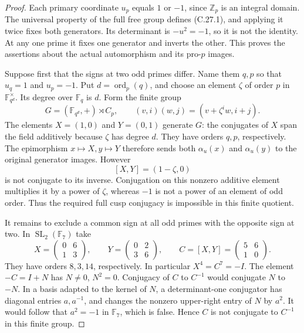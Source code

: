 \begin{proof}
Each primary coordinate $u_p$ equals $1$ or $-1$, since
$\mathbb Z_p$ is an integral domain.  The universal
property of the full free group defines (C.27.1), and
applying it twice fixes both generators.  Its determinant
is $-u^2=-1$, so it is not the identity.  At any one prime
it fixes one generator and inverts the other.  This
proves the assertions about the actual automorphism and
its pro-$p$ images.

Suppose first that the signs at two odd primes differ.
Name them $q,p$ so that $u_q=1$ and $u_p=-1$.  Put
$d=\operatorname{ord}_p(q)$, and choose an element
$\zeta$ of order $p$ in $\mathbb F_{q^d}^{\times}$.
Its degree over $\mathbb F_q$ is $d$.  Form the finite
group
\[
 G=(\mathbb F_{q^d},+)\rtimes C_p,
 \qquad (v,i)(w,j)=(v+\zeta^i w,i+j).
                                                               \tag{C.27.2}
\]
The elements $X=(1,0)$ and $Y=(0,1)$ generate $G$:
the conjugates of $X$ span the field additively because
$\zeta$ has degree $d$.  They have orders $q,p$,
respectively.  The epimorphism $x\mapsto X,y\mapsto Y$
therefore sends both $\alpha_u(x)$ and $\alpha_u(y)$
to the original generator images.  However
\[
 [X,Y]=(1-\zeta,0)
\]
is not conjugate to its inverse.  Conjugation on this
nonzero additive element multiplies it by a power of
$\zeta$, whereas $-1$ is not a power of an element of
odd order.  Thus the required full cusp conjugacy is
impossible in this finite quotient.

It remains to exclude a common sign at all odd primes
with the opposite sign at two.  In $\operatorname{SL}_2
(\mathbb F_7)$ take
\[
 X=\begin{pmatrix}0&6\\1&3\end{pmatrix},\qquad
 Y=\begin{pmatrix}0&2\\3&6\end{pmatrix},\qquad
 C=[X,Y]=\begin{pmatrix}5&6\\1&0\end{pmatrix}.              \tag{C.27.3}
\]
They have orders $8,3,14$, respectively.  In particular
$X^4=C^7=-I$.  The element $-C=I+N$ has $N\ne0$,
$N^2=0$.  Conjugacy of $C$ to $C^{-1}$ would conjugate
$N$ to $-N$.  In a basis adapted to the kernel of
$N$, a determinant-one conjugator has diagonal entries
$a,a^{-1}$, and changes the nonzero upper-right entry
of $N$ by $a^2$.  It would follow that $a^2=-1$ in
$\mathbb F_7$, which is false.  Hence $C$ is not
conjugate to $C^{-1}$ in this finite group.


\end{proof}
